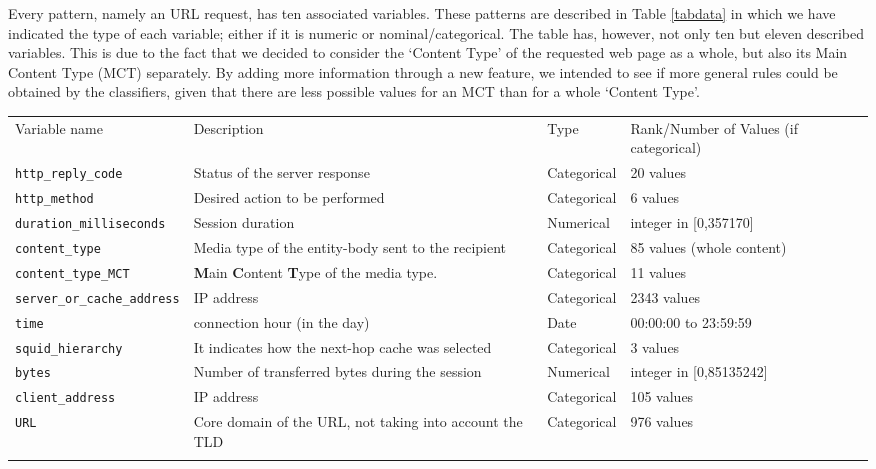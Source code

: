 \documentclass{llncs}
\begin{document}
Every pattern, namely an URL request, has ten associated variables. These patterns are described in Table \ref{tabdata} in which we have indicated the type of  each variable; either if it is numeric or nominal/categorical. The table has, however, not only ten but eleven described variables. This is due to the fact that we decided to consider the `Content Type' of the requested web page as a whole, but also its Main Content Type (MCT) separately. By adding more information through a new feature, we intended to see if more general rules could be obtained by the classifiers, given that there are less possible values for an MCT than for a whole `Content Type'.



\begin{table*}[htpb]
\centering
 \caption{\label{tabdata} Independent Variables corresponding to a URL
   request through \textit{HTTP}. The URLs are parsed as detailed in
   Subsection \ref{sec:buldingdataset}.}

{\scriptsize
\begin{tabular}{llll}
\hline\noalign{\smallskip}
Variable name & Description & Type & Rank/Number of Values (if categorical)\\
\noalign{\smallskip}\hline\noalign{\smallskip}
\texttt{http\_reply\_code} & Status of the server response & Categorical & 20 values\\
\texttt{http\_method} & Desired action to be performed & Categorical & 6 values\\
\texttt{duration\_milliseconds} & Session duration & Numerical & integer in [0,357170]\\
\texttt{content\_type} & Media type of the entity-body sent to the recipient & Categorical & 85 values (whole content)\\
\texttt{content\_type\_MCT} & \textbf{M}ain \textbf{C}ontent \textbf{T}ype of the media type. & Categorical & 11 values\\
\texttt{server\_or\_cache\_address} & IP address & Categorical & 2343 values\\
\texttt{time} & connection hour (in the day) & Date & 00:00:00 to 23:59:59\\
\texttt{squid\_hierarchy} & It indicates how the next-hop cache was selected & Categorical & 3 values\\
\texttt{bytes} & Number of transferred bytes during the session & Numerical & integer in [0,85135242]\\
\texttt{client\_address} & IP address & Categorical & 105 values\\
\texttt{URL} & Core domain of the URL, not taking into account the TLD & Categorical & 976 values\\
\noalign{\smallskip}\hline
\end{tabular}
}
\end{table*}
\end{document}
